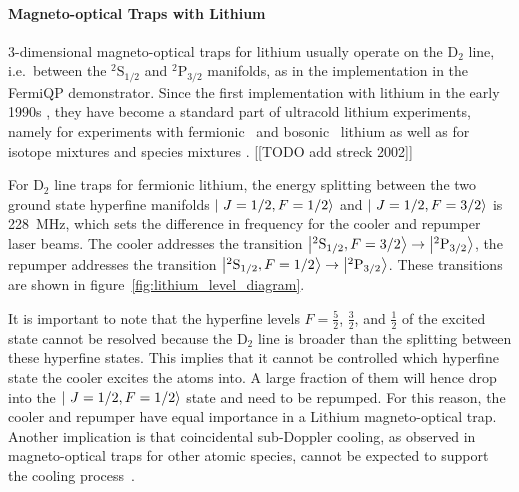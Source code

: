 \paragraph{Magneto-optical Traps with Lithium}
3-dimensional magneto-optical traps for lithium usually operate on the D$_2$ line, i.e.~between the $^2\text{S}_{1/2}$ and $^2\text{P}_{3/2}$ manifolds, as in the implementation in the FermiQP demonstrator. Since the first implementation with lithium in the early 1990s \cite{kawanaka_decay_1993}, they have become a standard part of ultracold lithium experiments, namely for experiments with fermionic~\cite{duarte_all-optical_2011,omran_microscopic_2015} and bosonic~\cite{kawanaka_decay_1993,schunemann_magneto-optic_1998} lithium as well as for isotope mixtures \cite{mewes_simultaneous_1999, hilker_laser_2012,kerkmann_novel_2019} and species mixtures \cite{ladouceur_compact_2009,tiecke_high-flux_2009,chen_lithium-cesium_2021}. [[TODO add streck 2002]]

For D$_2$ line traps for fermionic lithium, the energy splitting between the two ground state hyperfine manifolds $\Ket{~J=1/2, F=1/2}$ and $\Ket{~J=1/2, F=3/2}$ is \SI{228}{\mega\hertz}, which sets the difference in frequency for the cooler and repumper laser beams. The cooler addresses the transition $\Ket{^2\text{S}_{1/2}, F = 3/2} \rightarrow \Ket{^2\text{P}_{3/2}}$, the repumper addresses the transition $\Ket{^2\text{S}_{1/2}, F = 1/2} \rightarrow \Ket{^2\text{P}_{3/2}}$. These transitions are shown in figure~\ref{fig:lithium_level_diagram}.

It is important to note that the hyperfine levels $F = \frac{5}{2}$, $\frac{3}{2}$, and $\frac{1}{2}$ of the excited state cannot be resolved because the D$_2$ line is broader than the splitting between these hyperfine states. This implies that it cannot be controlled which hyperfine state the cooler excites the atoms into. A large fraction of them will hence drop into the $\Ket{~J=1/2, F=1/2}$ state and need to be repumped. For this reason, the cooler and repumper have equal importance in a Lithium magneto-optical trap. Another implication is that coincidental sub-Doppler cooling, as observed in magneto-optical traps for other atomic species, cannot be expected to support the cooling process~\cite{grier_lambda-enhanced_2013}.

